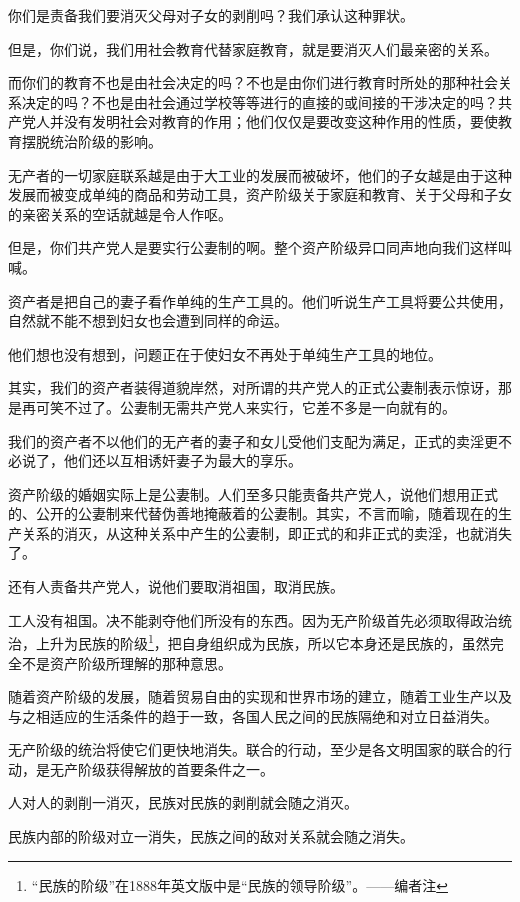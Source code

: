 \documentclass[UTF8,zihao=-4,a4paper]{ctexart}
\begin{document}
你们是责备我们要消灭父母对子女的剥削吗？我们承认这种罪状。\par
但是，你们说，我们用社会教育代替家庭教育，就是要消灭人们最亲密的关系。\par
而你们的教育不也是由社会决定的吗？不也是由你们进行教育时所处的那种社会关系决定的吗？不也是由社会通过学校等等进行的直接的或间接的干涉决定的吗？共产党人并没有发明社会对教育的作用；他们仅仅是要改变这种作用的性质，要使教育摆脱统治阶级的影响。\par
无产者的一切家庭联系越是由于大工业的发展而被破坏，他们的子女越是由于这种发展而被变成单纯的商品和劳动工具，资产阶级关于家庭和教育、关于父母和子女的亲密关系的空话就越是令人作呕。\par
但是，你们共产党人是要实行公妻制的啊。整个资产阶级异口同声地向我们这样叫喊。\par
资产者是把自己的妻子看作单纯的生产工具的。他们听说生产工具将要公共使用，自然就不能不想到妇女也会遭到同样的命运。\par
他们想也没有想到，问题正在于使妇女不再处于单纯生产工具的地位。\par
其实，我们的资产者装得道貌岸然，对所谓的共产党人的正式公妻制表示惊讶，那是再可笑不过了。公妻制无需共产党人来实行，它差不多是一向就有的。\par
我们的资产者不以他们的无产者的妻子和女儿受他们支配为满足，正式的卖淫更不必说了，他们还以互相诱奸妻子为最大的享乐。\par
资产阶级的婚姻实际上是公妻制。人们至多只能责备共产党人，说他们想用正式的、公开的公妻制来代替伪善地掩蔽着的公妻制。其实，不言而喻，随着现在的生产关系的消灭，从这种关系中产生的公妻制，即正式的和非正式的卖淫，也就消失了。\par
还有人责备共产党人，说他们要取消祖国，取消民族。\par
工人没有祖国。决不能剥夺他们所没有的东西。因为无产阶级首先必须取得政治统治，上升为民族的阶级\footnote{“民族的阶级”在1888年英文版中是“民族的领导阶级”。——编者注}，把自身组织成为民族，所以它本身还是民族的，虽然完全不是资产阶级所理解的那种意思。\par
随着资产阶级的发展，随着贸易自由的实现和世界市场的建立，随着工业生产以及与之相适应的生活条件的趋于一致，各国人民之间的民族隔绝和对立日益消失。\par
无产阶级的统治将使它们更快地消失。联合的行动，至少是各文明国家的联合的行动，是无产阶级获得解放的首要条件之一。\par
人对人的剥削一消灭，民族对民族的剥削就会随之消灭。\par
民族内部的阶级对立一消失，民族之间的敌对关系就会随之消失。\par
\end{document}
